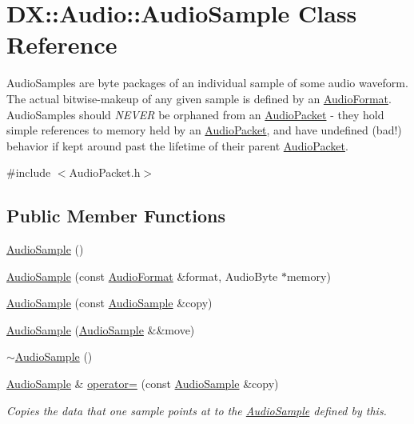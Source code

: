 \hypertarget{class_d_x_1_1_audio_1_1_audio_sample}{\section{D\-X\-:\-:Audio\-:\-:Audio\-Sample Class Reference}
\label{class_d_x_1_1_audio_1_1_audio_sample}
}


Audio\-Samples are byte packages of an individual sample of some audio waveform. The actual bitwise-\/makeup of any given sample is defined by an \hyperlink{struct_d_x_1_1_audio_1_1_audio_format}{Audio\-Format}. Audio\-Samples should {\itshape N\-E\-V\-E\-R} be orphaned from an \hyperlink{class_d_x_1_1_audio_1_1_audio_packet}{Audio\-Packet} -\/ they hold simple references to memory held by an \hyperlink{class_d_x_1_1_audio_1_1_audio_packet}{Audio\-Packet}, and have undefined (bad!) behavior if kept around past the lifetime of their parent \hyperlink{class_d_x_1_1_audio_1_1_audio_packet}{Audio\-Packet}.  




{\ttfamily \#include $<$Audio\-Packet.\-h$>$}

\subsection*{Public Member Functions}
\begin{DoxyCompactItemize}
\item 
\hyperlink{class_d_x_1_1_audio_1_1_audio_sample_ae8eb2486b80e7c7718a752ff738e8865}{Audio\-Sample} ()
\item 
\hyperlink{class_d_x_1_1_audio_1_1_audio_sample_afda761bd77a5dd23c198ada0c2ded88e}{Audio\-Sample} (const \hyperlink{struct_d_x_1_1_audio_1_1_audio_format}{Audio\-Format} \&format, Audio\-Byte $\ast$memory)
\item 
\hyperlink{class_d_x_1_1_audio_1_1_audio_sample_add0befe561a61667d7dc33bb9f41d311}{Audio\-Sample} (const \hyperlink{class_d_x_1_1_audio_1_1_audio_sample}{Audio\-Sample} \&copy)
\item 
\hyperlink{class_d_x_1_1_audio_1_1_audio_sample_adce1429f7e4e4aca198a7915a009efb2}{Audio\-Sample} (\hyperlink{class_d_x_1_1_audio_1_1_audio_sample}{Audio\-Sample} \&\&move)
\item 
\hyperlink{class_d_x_1_1_audio_1_1_audio_sample_a43cffccb172cda275cc68b1d9c6cfdb9}{$\sim$\-Audio\-Sample} ()
\item 
\hyperlink{class_d_x_1_1_audio_1_1_audio_sample}{Audio\-Sample} \& \hyperlink{class_d_x_1_1_audio_1_1_audio_sample_a7e54bfe2076f4f8c0f78616e015636e0}{operator=} (const \hyperlink{class_d_x_1_1_audio_1_1_audio_sample}{Audio\-Sample} \&copy)
\begin{DoxyCompactList}\small\item\em Copies the data that one sample points at to the \hyperlink{class_d_x_1_1_audio_1_1_audio_sample}{Audio\-Sample} defined by this. \end{DoxyCompactList}\end{DoxyCompactItemize}


